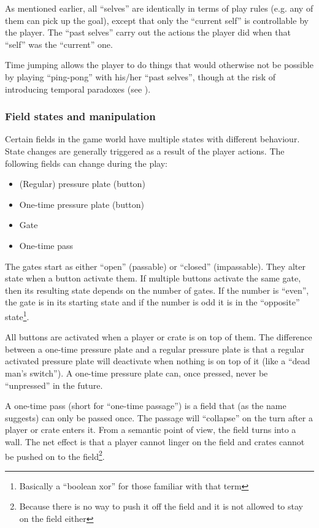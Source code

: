 As mentioned earlier, all ``selves'' are identically in terms of play
rules (e.g. any of them can pick up the goal), except that only the
``current self'' is controllable by the player.  The ``past selves''
carry out the actions the player did when that ``self'' was the
``current'' one.

Time jumping allows the player to do things that would otherwise not
be possible by playing ``ping-pong'' with his/her ``past selves'',
though at the risk of introducing temporal paradoxes (see
).

\subsubsection{Field states and manipulation}
\label{field-states}
Certain fields in the game world have multiple states with different
behaviour.  State changes are generally triggered as a result of the
player actions.  The following fields can change during the play:

\begin{itemize}
\item (Regular) pressure plate (button)
\item One-time pressure plate (button)
\item Gate
\item One-time pass
\end{itemize}

The gates start as either ``open'' (passable) or ``closed''
(impassable).  They alter state when a button activate them.  If
multiple buttons activate the same gate, then its resulting state
depends on the number of gates.  If the number is ``even'', the
gate is in its starting state and if the number is odd it is in the
``opposite'' state\footnote{Basically a ``boolean xor'' for those
  familiar with that term}.

All buttons are activated when a player or crate is on top of them.
The difference between a one-time pressure plate and a regular
pressure plate is that a regular activated pressure plate will
deactivate when nothing is on top of it (like a ``dead man's
switch'').  A one-time pressure plate can, once pressed, never be
``unpressed'' in the future.

A one-time pass (short for ``one-time passage'') is a field that
(as the name suggests) can only be passed once.  The passage will
``collapse'' on the turn after a player or crate enters it.  From a
semantic point of view, the field turns into a wall.  The net effect
is that a player cannot linger on the field and crates cannot be pushed
on to the field\footnote{Because there is no way to push it off the field
and it is not allowed to stay on the field either}.

